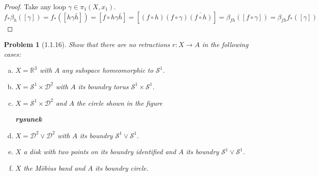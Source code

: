 \documentclass[11pt, a4paper, final]{amsart}
\newcommand{\R}{{\mathbb{R}}}
\newcommand\todo[1]{\textbf{\textcolor{redd}{#1}}}
\newcommand{\sphere}{\mathcal{S}}
\newcommand{\disk}{\mathcal{D}}
\numberwithin{theorem}{section}
\newtheorem{problem}[theorem]{Problem}
\theoremstyle{definition}
\theoremstyle{remark}
\begin{document}
\begin{proof}
    Take any loop $\gamma \in \pi_1(X, x_1)$.
    $$f_* \beta_h ([\gamma]) = f_*([h\gamma\bar{h}]) = [f\circ h\gamma\bar{h}] = [(f\circ h)(f \circ \gamma)\overline{(f \circ h)}] = \beta_{fh}([f \circ \gamma]) = \beta_{fh}f_*([\gamma])$$
\end{proof}

\begin{problem}[1.1.16]\label{problem: 1.1.16}
    Show that there are no retractions $r:X \rightarrow A$ in the following cases:
    \begin{enumerate}[(a)]
        \item $X = \R^3$ with $A$ any subspace homeomorphic to $\sphere^1$.
        
        \item $X = \sphere^1 \times \disk^2$ with $A$ its boundry torus $\sphere^1 \times \sphere^1$.
        
        \item $X = \sphere^1 \times \disk^2$ and $A$ the circle shown in the figure

        \todo{rysunek}

        \item $X = \disk^2 \vee \disk^2$ with $A$ its boundry $\sphere^1 \vee \sphere^1$.

        \item $X$ a disk with two points on its boundry identified and $A$ its boundry $\sphere^1 \vee \sphere^1$.

        \item $X$ the M\"obius band and $A$ its boundry circle.
    \end{enumerate}
\end{problem}
\end{document}
